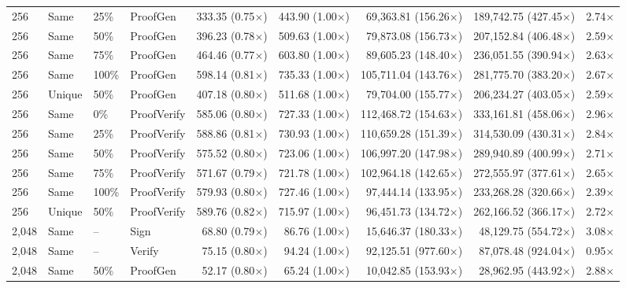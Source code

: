 \begin{table}[t]
{\begin{tabular}{llllrrrrr}
256 & Same & 25\% & ProofGen & 333.35 (0.75$\times$) & 443.90 (1.00$\times$) & 69,363.81 (156.26$\times$) & 189,742.75 (427.45$\times$) & 2.74$\times$ \\
256 & Same & 50\% & ProofGen & 396.23 (0.78$\times$) & 509.63 (1.00$\times$) & 79,873.08 (156.73$\times$) & 207,152.84 (406.48$\times$) & 2.59$\times$ \\
256 & Same & 75\% & ProofGen & 464.46 (0.77$\times$) & 603.80 (1.00$\times$) & 89,605.23 (148.40$\times$) & 236,051.55 (390.94$\times$) & 2.63$\times$ \\
256 & Same & 100\% & ProofGen & 598.14 (0.81$\times$) & 735.33 (1.00$\times$) & 105,711.04 (143.76$\times$) & 281,775.70 (383.20$\times$) & 2.67$\times$ \\
256 & Unique & 50\% & ProofGen & 407.18 (0.80$\times$) & 511.68 (1.00$\times$) & 79,704.00 (155.77$\times$) & 206,234.27 (403.05$\times$) & 2.59$\times$ \\
256 & Same & 0\% & ProofVerify & 585.06 (0.80$\times$) & 727.33 (1.00$\times$) & 112,468.72 (154.63$\times$) & 333,161.81 (458.06$\times$) & 2.96$\times$ \\
256 & Same & 25\% & ProofVerify & 588.86 (0.81$\times$) & 730.93 (1.00$\times$) & 110,659.28 (151.39$\times$) & 314,530.09 (430.31$\times$) & 2.84$\times$ \\
256 & Same & 50\% & ProofVerify & 575.52 (0.80$\times$) & 723.06 (1.00$\times$) & 106,997.20 (147.98$\times$) & 289,940.89 (400.99$\times$) & 2.71$\times$ \\
256 & Same & 75\% & ProofVerify & 571.67 (0.79$\times$) & 721.78 (1.00$\times$) & 102,964.18 (142.65$\times$) & 272,555.97 (377.61$\times$) & 2.65$\times$ \\
256 & Same & 100\% & ProofVerify & 579.93 (0.80$\times$) & 727.46 (1.00$\times$) & 97,444.14 (133.95$\times$) & 233,268.28 (320.66$\times$) & 2.39$\times$ \\
256 & Unique & 50\% & ProofVerify & 589.76 (0.82$\times$) & 715.97 (1.00$\times$) & 96,451.73 (134.72$\times$) & 262,166.52 (366.17$\times$) & 2.72$\times$ \\
\midrule
2,048 & Same & -- & Sign & 68.80 (0.79$\times$) & 86.76 (1.00$\times$) & 15,646.37 (180.33$\times$) & 48,129.75 (554.72$\times$) & 3.08$\times$ \\
2,048 & Same & -- & Verify & 75.15 (0.80$\times$) & 94.24 (1.00$\times$) & 92,125.51 (977.60$\times$) & 87,078.48 (924.04$\times$) & 0.95$\times$ \\
2,048 & Same & 50\% & ProofGen & 52.17 (0.80$\times$) & 65.24 (1.00$\times$) & 10,042.85 (153.93$\times$) & 28,962.95 (443.92$\times$) & 2.88$\times$ \\

\end{tabular}}
\end{table}
